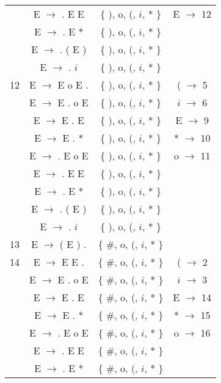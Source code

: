 \begin{center}
\begin{longtable}{r|ccc}
      &  E $\rightarrow$ . E E        & \{ ), o, (, $i$, * \} &   E   $\rightarrow$  12  \\
      &  E $\rightarrow$ . E *      & \{ ), o, (, $i$, * \} &               \\
      &  E $\rightarrow$ . ( E )  & \{ ), o, (, $i$, * \} &               \\
      &  E $\rightarrow$ . $i$        & \{ ), o, (, $i$, * \} &               \\
\hline
12    &  E $\rightarrow$ E o E .    & \{ ), o, (, $i$, * \} &  (  $\rightarrow$  5   \\
      &  E $\rightarrow$ E . o E    & \{ ), o, (, $i$, * \} &  $i$  $\rightarrow$  6   \\
      &  E $\rightarrow$ E . E        & \{ ), o, (, $i$, * \} &   E   $\rightarrow$  9   \\
      &  E $\rightarrow$ E . *      & \{ ), o, (, $i$, * \} &  *  $\rightarrow$  10  \\
      &  E $\rightarrow$ . E o E    & \{ ), o, (, $i$, * \} &  o  $\rightarrow$  11  \\
      &  E $\rightarrow$ . E E        & \{ ), o, (, $i$, * \} &               \\
      &  E $\rightarrow$ . E *      & \{ ), o, (, $i$, * \} &               \\
      &  E $\rightarrow$ . ( E )  & \{ ), o, (, $i$, * \} &               \\
      &  E $\rightarrow$ . $i$        & \{ ), o, (, $i$, * \} &               \\
\hline
13    &  E $\rightarrow$ ( E ) .  & \{ \#, o, (, $i$, * \}   &               \\
\hline
14    &  E $\rightarrow$ E E .        & \{ \#, o, (, $i$, * \}   &  (  $\rightarrow$  2   \\
      &  E $\rightarrow$ E . o E    & \{ \#, o, (, $i$, * \}   &  $i$  $\rightarrow$  3   \\
      &  E $\rightarrow$ E . E        & \{ \#, o, (, $i$, * \}   &   E   $\rightarrow$  14  \\
      &  E $\rightarrow$ E . *      & \{ \#, o, (, $i$, * \}   &  *  $\rightarrow$  15  \\
      &  E $\rightarrow$ . E o E    & \{ \#, o, (, $i$, * \}   &  o  $\rightarrow$  16  \\
      &  E $\rightarrow$ . E E        & \{ \#, o, (, $i$, * \}   &               \\
      &  E $\rightarrow$ . E *      & \{ \#, o, (, $i$, * \}   &               \\

\end{longtable}
\end{center}
